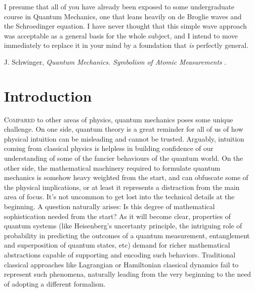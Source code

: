 


\label{chp:fundamentals} 


\begin{refsection}
\begin{quoting}
   \openquote 
   I presume that all of you have already been exposed to some undergraduate
   course in Quantum Mechanics, one that leans heavily on de Broglie waves and
   the Schroedinger equation. I have never thought that this simple wave
   approach was acceptable as a general basis for the whole subject, and I
   intend to move immediately to replace it in your mind by a foundation that
   \emph{is} perfectly general.~\closequote
   \begin{flushright}
       J. Schwinger,
       \emph{Quantum Mechanics. Symbolism of Atomic Measurements}
       \textcite{Schwinger:2001}.
    \end{flushright}
\end{quoting}

\section{Introduction}

\lettrine{C}{ompared} 
to other areas of physics, quantum mechanics poses some unique challenge.
On one side, quantum theory is a great reminder for all of us of how physical intuition can be misleading and cannot be trusted. 
  Arguably,  intuition coming from classical physics is helpless in building confidence of our understanding of some of the fancier behaviours of the quantum world. 
  On the other side, the mathematical machinery required to formulate quantum mechanics is somehow heavy weighted from the start, and can obfuscate some of the physical implications, or at least it represents a distraction from the main area of focus. 
  It's not uncommon to get lost into the technical details at the beginning. 
A question naturally arises: Is this degree of mathematical sophistication  needed from the start?
  As it will become clear, properties of quantum systems (like Heisenberg's uncertanty principle, the intriguing role of probability in predicting the
outcomes of a quantum measurement, entanglement and superposition of quantum
  states, etc) demand for richer mathematical abstractions capable of supporting and
encoding such behaviors. Traditional classical approaches like Lagrangian or Hamiltonian classical dynamics fail 
to represent 
such phenomena, naturally leading from the very beginning to the need of adopting a different formalism. 



\end{refsection}

